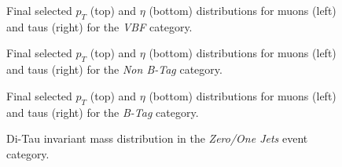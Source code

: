 \begin{figure}[ht]
\hspace{0.5cm}

%
%
\caption{Final selected $p_{T}$ (top) and $\eta$ (bottom) distributions for muons (left) and  taus (right) for the \emph{VBF} category.}
\label{fig:finalleptonvbf}
\end{figure}

\begin{figure}[ht]

%
%
\caption{Final selected $p_{T}$ (top) and $\eta$ (bottom) distributions for muons (left) and  taus (right) for the \emph{Non B-Tag} category.}
\label{fig:finalleptonwobtag}
\end{figure}

\begin{figure}[ht]

%
%
\caption{Final selected $p_{T}$ (top) and $\eta$ (bottom) distributions for muons (left) and  taus (right) for the \emph{B-Tag} category.}
\label{fig:finalleptonwbtag}
\end{figure}

\begin{figure}[ht]
\caption{Di-Tau invariant mass distribution in the \emph{Zero/One Jets} event category.}
\label{fig:smmasszerojets}
\end{figure}

